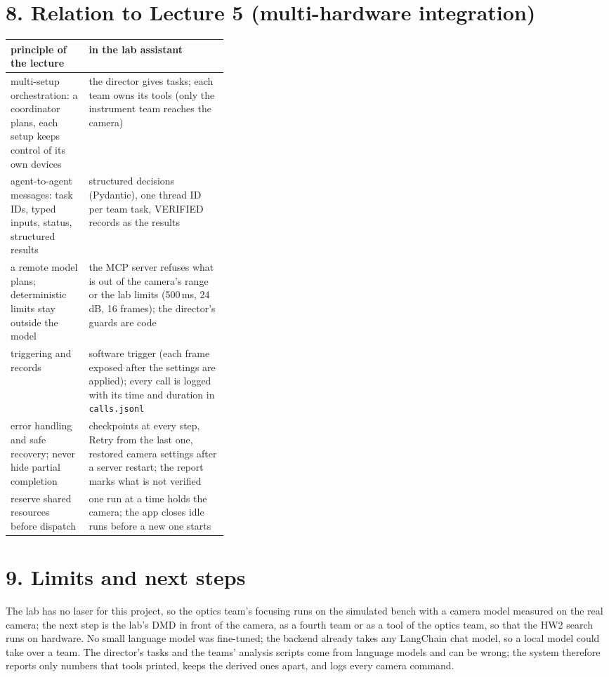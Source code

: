 \documentclass[11pt,a4paper]{article}
\begin{document}
\section*{8. Relation to Lecture 5 (multi-hardware integration)}
\begin{center}\small
\begin{tabularx}{\linewidth}{@{}p{0.36\linewidth}X@{}}
\toprule
principle of the lecture & in the lab assistant\\ \midrule
multi-setup orchestration: a coordinator plans, each setup keeps control of its own devices & the director gives tasks;
  each team owns its tools (only the instrument team reaches the camera)\\
agent-to-agent messages: task IDs, typed inputs, status, structured results & structured decisions (Pydantic), one
  thread ID per team task, VERIFIED records as the results\\
a remote model plans; deterministic limits stay outside the model & the MCP server refuses what is out of the camera's
  range or the lab limits (500\,ms, 24\,dB, 16 frames); the director's guards are code\\
triggering and records & software trigger (each frame exposed after the settings are applied); every call is logged
  with its time and duration in \texttt{calls.jsonl}\\
error handling and safe recovery; never hide partial completion & checkpoints at every step, Retry from the last one,
  restored camera settings after a server restart; the report marks what is not verified\\
reserve shared resources before dispatch & one run at a time holds the camera; the app closes idle runs before a new
  one starts\\
\bottomrule
\end{tabularx}
\end{center}

\section*{9. Limits and next steps}
The lab has no laser for this project, so the optics team's focusing runs on the simulated bench with a camera model
measured on the real camera; the next step is the lab's DMD in front of the camera, as a fourth team or as a tool of the
optics team, so that the HW2 search runs on hardware. No small language model was fine-tuned; the backend already takes
any LangChain chat model, so a local model could take over a team. The director's tasks and the teams' analysis scripts
come from language models and can be wrong; the system therefore reports only numbers that tools printed, keeps the
derived ones apart, and logs every camera command.
\end{document}
